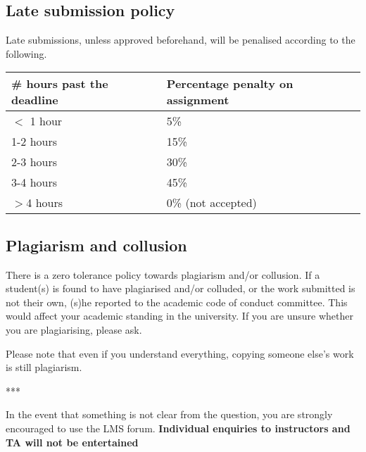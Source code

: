 \documentclass[answers]{exam}
\begin{document}
\subsection{Late submission policy}
Late submissions, unless approved beforehand, will be penalised according to the following. 
\begin{center}
    \begin{tabular}{ | l | l |}
    \hline
    \# hours past the deadline & Percentage penalty on assignment  \\ \hline
    $<$ 1 hour & 5\% \\ \hline
    1-2 hours & 15\% \\ \hline
    2-3 hours & 30\% \\ \hline
    3-4 hours & 45\% \\ \hline
    $>$4  hours & 0\% (not accepted) \\ \hline
    \end{tabular}
\end{center}


\subsection{Plagiarism and collusion}
There is a zero tolerance policy towards plagiarism and/or collusion. If a student(s) is found to have plagiarised and/or colluded, or the work submitted is not their own, (s)he reported to the academic code of conduct committee. This would affect your academic standing in the university. If you are unsure whether you are plagiarising, please ask.

Please note that even if you understand everything, copying someone else's work is still plagiarism.     
\begin{center}
***
\end{center}


In the event that something is not clear from the question, you are strongly encouraged to use the LMS forum. \textbf{Individual enquiries to instructors and TA will not be entertained}
\end{document}

